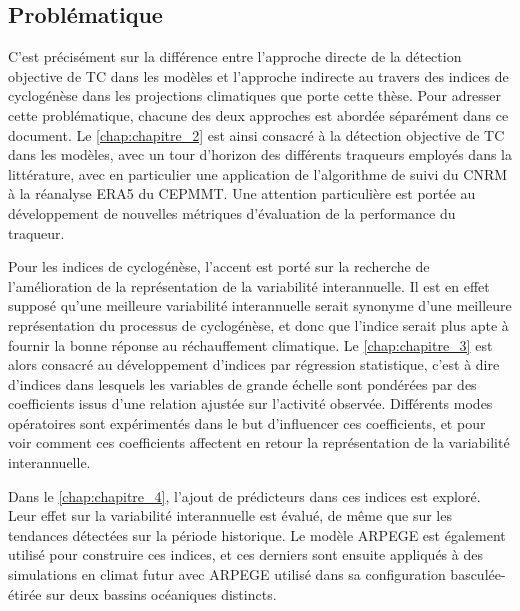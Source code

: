 \documentclass[../main.tex]{subfiles}
\begin{document}
\subsection*{Problématique}

C'est précisément sur la différence entre l'approche directe de la détection objective de TC dans les modèles et l'approche indirecte au travers des indices de
cyclogénèse dans les projections climatiques que porte cette thèse. Pour adresser cette problématique, chacune des deux approches est abordée séparément dans ce
document. Le \cref{chap:chapitre_2} est ainsi consacré à la détection objective de TC dans les modèles, avec un tour d'horizon des différents traqueurs employés
dans la littérature, avec en particulier une application de l'algorithme de suivi du CNRM à la réanalyse ERA5 du CEPMMT. Une attention particulière est portée
au développement de nouvelles métriques d'évaluation de la performance du traqueur.

Pour les indices de cyclogénèse, l'accent est porté sur la recherche de l'amélioration de la représentation de la variabilité interannuelle. Il est en effet
supposé qu'une meilleure variabilité interannuelle serait synonyme d'une meilleure représentation du processus de cyclogénèse, et donc que l'indice serait plus
apte à fournir la bonne réponse au réchauffement climatique. Le \cref{chap:chapitre_3} est alors consacré au développement d'indices par régression statistique,
c'est à dire d'indices dans lesquels les variables de grande échelle sont pondérées par des coefficients issus d'une relation ajustée sur l'activité observée.
Différents modes opératoires sont expérimentés dans le but d'influencer ces coefficients, et pour voir comment ces coefficients affectent en retour la
représentation de la variabilité interannuelle.

Dans le \cref{chap:chapitre_4}, l'ajout de prédicteurs dans ces indices est exploré. Leur effet sur la variabilité interannuelle est évalué, de même que sur
les tendances détectées sur la période historique. Le modèle ARPEGE est également utilisé pour construire ces indices, et ces derniers sont ensuite appliqués à
des simulations en climat futur avec ARPEGE utilisé dans sa configuration basculée-étirée sur deux bassins océaniques distincts.
\end{document}
